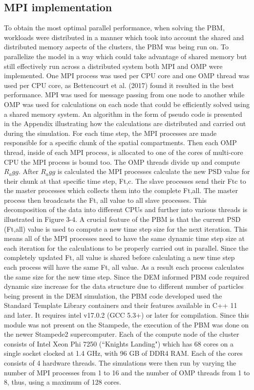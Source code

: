\documentclass[preprint,10pt,authoryear]{elsarticle}
\begin{document}
\begin{linenumbers}
\subsection{MPI implementation}
To obtain the most optimal parallel performance, when‎ solving the PBM, workloads 
were distributed in a manner which took into account the shared and‎ distributed 
memory aspects of the clusters, the PBM was being run on. To parallelize the model 
in a way which could take advantage of shared memory but still effectively run 
across a distributed system both MPI and OMP were implemented. One MPI process 
was used per CPU core and one‎ OMP thread was used per CPU core, as 
Bettencourt et al. (2017) found it resulted in the best‎ performance. MPI was 
used for message passing from one node to another while OMP was used‎ for 
calculations on each node that could be efficiently solved using a shared 
memory system.‎ An algorithm in the form of pseudo code is presented in the 
Appendix illustrating how the calculations‎ are distributed and carried out 
during the simulation. For each time step, the MPI processes are‎ made 
responsible for a specific chunk of the spatial compartments. Then each 
OMP thread, inside‎ of each MPI process, is allocated to one of the cores 
of multi-core CPU the MPI process is bound‎ too. The OMP threads divide up 
and compute $R_agg$. After $R_agg$ is calculated the MPI processes‎ calculate 
the new PSD value for their chunk at that specific time step, Ft,c. The 
slave processes‎ send their Ftc to the master processes which collects them 
into the complete Ft,all. The master‎ process then broadcasts the Ft, all 
value to all slave processes. This decomposition of the data into‎ 
different CPUs and further into various threads is illustrated in 
Figure 3-4.‎ A crucial feature of the PBM is that the current PSD (Ft,all) 
value is used to compute a new‎ time step size for the next iteration. 
This means all of the MPI processes need to have the same‎ dynamic time 
step size at each iteration for the calculations to be properly carried 
out in parallel.‎ Since the completely updated Ft, all value is shared 
before calculating a new time step each process‎ will have the same Ft, 
all value. As a result each process calculates the same size for the 
new time‎ step.‎ Since the DEM informed PBM code required dynamic size 
increase for the data structure due‎ to different number of particles 
being present in the DEM simulation, the PBM code developed‎ used the 
Standard Template Library containers and their features available 
in C++ 11 and later.‎ It requires intel v17.0.2 (GCC 5.3+) or later 
for compilation. Since this module was not present on‎ the Stampede,
the execution of the PBM was done on the newer Stampede2 supercomputer. 
Each‎ of the compute node of the cluster consists of Intel Xeon Phi 7250 
(“Knights Landing") which has‎ 68 cores on a single socket clocked at 1.4 GHz, 
with 96 GB of DDR4 RAM. Each of the cores‎ consists of 4 hardware threads. 
The simulations were then run by varying the number of MPI‎ processes from 
1 to 16 and the number of OMP threads from 1 to 8, thus, using a maximum of 128‎ cores.


\end{linenumbers}
\end{document}
